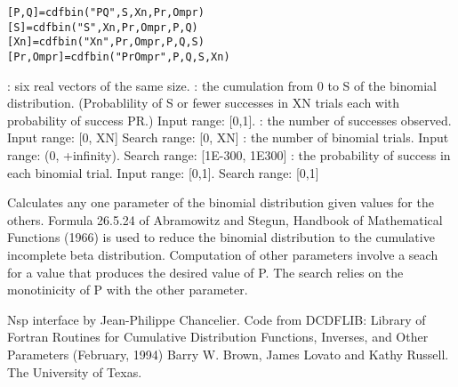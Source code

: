 \begin{mandesc}
\end{mandesc}
\label{cdfbin}
\begin{calling_sequence}
\begin{verbatim}
[P,Q]=cdfbin("PQ",S,Xn,Pr,Ompr)  
[S]=cdfbin("S",Xn,Pr,Ompr,P,Q)  
[Xn]=cdfbin("Xn",Pr,Ompr,P,Q,S)  
[Pr,Ompr]=cdfbin("PrOmpr",P,Q,S,Xn)  
\end{verbatim}
\end{calling_sequence}
\begin{parameters}
  \begin{varlist}
    : six real vectors of the same size.
    : the cumulation from 0 to S of the binomial distribution. (Probablility of S or fewer successes in XN trials each with probability of success PR.) Input range: [0,1].
    : the number of successes observed. Input range: [0, XN] Search range: [0, XN]
    : the number of binomial trials. Input range: (0, +infinity). Search range: [1E-300, 1E300]
    : the probability of success in each binomial trial. Input range: [0,1]. Search range: [0,1]
  \end{varlist}
\end{parameters}

\begin{mandescription}
  Calculates any one parameter of the binomial distribution given values for the others.
  Formula  26.5.24    of   Abramowitz  and    Stegun,  Handbook   of
  Mathematical   Functions (1966) is   used  to reduce the  binomial
  distribution  to  the  cumulative incomplete    beta distribution.
  Computation of other parameters involve a seach for a value that
  produces  the desired  value  of P.   The search relies  on  the
  monotinicity of P with the other parameter.
\end{mandescription}
\begin{authors}
  Nsp interface by Jean-Philippe Chancelier. Code from DCDFLIB: 
  Library of Fortran Routines for Cumulative Distribution
  Functions, Inverses, and Other Parameters (February, 1994)
  Barry W. Brown, James Lovato and Kathy Russell. The University of Texas.
\end{authors}

